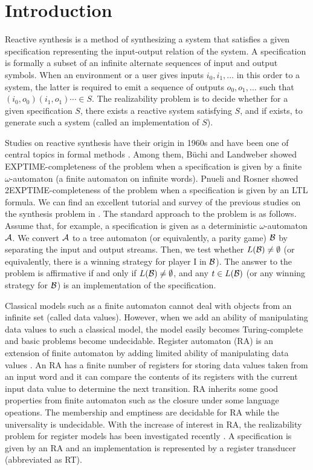 \section{Introduction}
\noindent
Reactive synthesis is a method of synthesizing a system that satisfies a given specification
representing the input-output relation of the system.
A specification is formally a subset of an infinite alternate sequences of input and output symbols.
When an environment or a user gives inputs $i_0, i_1, \ldots$ in this order
to a system, the latter is required to emit a sequence
of outputs $o_0, o_1, \ldots$ such that $(i_0, o_0)(i_1, o_1)\cdots \in S$.
The realizability problem is to decide whether for a given specification $S$,
there exists a reactive system satisfying $S$, and if exists, to generate such a system
(called an implementation of $S$).

Studies on reactive synthesis have their origin in 1960s and have been one of central topics
in formal methods \cite{CGP01}.
Among them, B\"{u}chi and Landweber \cite{BL69} showed EXPTIME-completeness of the problem
when a specification is given by a finite $\omega$-automaton (a finite automaton on infinite words).
Pnueli and Rosner \cite{PR89} showed 2EXPTIME-completeness of the problem
when a specification is given by an LTL formula.
We can find an excellent tutorial and survey of the previous studies
on the synthesis problem in \cite{BCJ18}.
The standard approach to the problem is as follows.
Assume that, for example, a specification is given as a deterministic $\omega$-automaton ${\cal A}$.
We convert ${\cal A}$ to a tree automaton (or equivalently, a parity game) ${\cal B}$
by separating the input and output streams.
Then, we test whether $L({\cal B})\neq\emptyset$ (or equivalently, there is a winning strategy
for player I in ${\cal B}$).
The answer to the problem is affirmative if and only if $L({\cal B})\not=\emptyset$,
and any $t\in L({\cal B})$ (or any winning strategy for ${\cal B}$)
is an implementation of the specification.

Classical models such as a finite automaton cannot deal with
objects from an infinite set (called data values).
However, when we add an ability of manipulating data values to such a classical model,
the model easily becomes Turing-complete and basic problems become undecidable.
Register automaton (RA) is an extension of finite automaton by adding limited ability of
manipulating data values \cite{Bo02,KF94,NSV04,Se06}.
An RA has a finite number of registers for storing data values taken from an input word and
it can compare the contents of its registers with the current input data value
to determine the next transition.
RA inherits some good properties from finite automaton such as the closure under some
language opeations.
The membership and emptiness are decidable for RA while the universality is undecidable.
With the increase of interest in RA, the realizability problem for register models
has been investigated recently \cite{ESK14,KMB18,EFR19,KK19}.
A specification is given by an RA and
an implementation is represented by a register transducer (abbreviated as RT).

